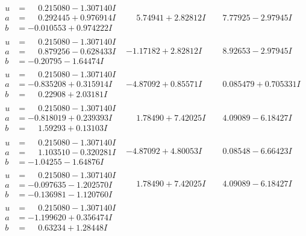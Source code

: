 \documentclass[1p]{elsarticle_modified}
\theoremstyle{definition}
\begin{document}
$$\begin{array}{c|c|c}
\begin{aligned}
u &= \phantom{-}0.215080 - 1.307140 I \\
a &= \phantom{-}0.292445 + 0.976914 I \\
b &= -0.010553 + 0.974222 I\end{aligned}
 & \phantom{-}5.74941 + 2.82812 I & \phantom{-}7.77925 - 2.97945 I \\ \hline\begin{aligned}
u &= \phantom{-}0.215080 - 1.307140 I \\
a &= \phantom{-}0.879256 - 0.628433 I \\
b &= -0.20795 - 1.64474 I\end{aligned}
 & -1.17182 + 2.82812 I & \phantom{-}8.92653 - 2.97945 I \\ \hline\begin{aligned}
u &= \phantom{-}0.215080 - 1.307140 I \\
a &= -0.835208 + 0.315914 I \\
b &= \phantom{-}0.22908 + 2.03181 I\end{aligned}
 & -4.87092 + 0.85571 I & \phantom{-}0.085479 + 0.705331 I \\ \hline\begin{aligned}
u &= \phantom{-}0.215080 - 1.307140 I \\
a &= -0.818019 + 0.239393 I \\
b &= \phantom{-}1.59293 + 0.13103 I\end{aligned}
 & \phantom{-}1.78490 + 7.42025 I & \phantom{-}4.09089 - 6.18427 I \\ \hline\begin{aligned}
u &= \phantom{-}0.215080 - 1.307140 I \\
a &= \phantom{-}1.103510 - 0.320281 I \\
b &= -1.04255 - 1.64876 I\end{aligned}
 & -4.87092 + 4.80053 I & \phantom{-}0.08548 - 6.66423 I \\ \hline\begin{aligned}
u &= \phantom{-}0.215080 - 1.307140 I \\
a &= -0.097635 - 1.202570 I \\
b &= -0.136981 - 1.120760 I\end{aligned}
 & \phantom{-}1.78490 + 7.42025 I & \phantom{-}4.09089 - 6.18427 I \\ \hline\begin{aligned}
u &= \phantom{-}0.215080 - 1.307140 I \\
a &= -1.199620 + 0.356474 I \\
b &= \phantom{-}0.63234 + 1.28448 I\end{aligned}

\end{array}$$
\end{document}
